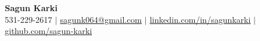 \documentclass[letterpaper,11pt]{article}
\begin{document}
\sloppy

\begin{center}
  {\LARGE\bfseries Sagun Karki} \\[4pt]
  531-229-2617 $|$ \href{mailto:sagunk064@gmail.com}{sagunk064@gmail.com} $|$
  \href{https://linkedin.com/in/sagunkarki}{linkedin.com/in/sagunkarki} $|$
  \href{https://github.com/sagun-karki}{github.com/sagun-karki}
\end{center}

\vspace{-10pt}


\end{document}
